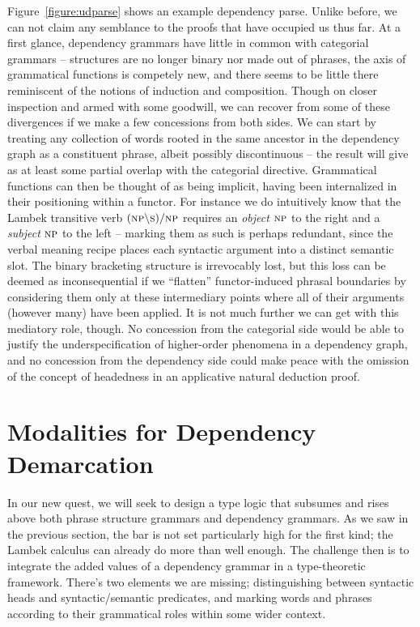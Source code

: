 Figure~\ref{figure:udparse} shows an example dependency parse.
Unlike before, we can not claim any semblance to the proofs that have occupied us thus far.
At a first glance, dependency grammars have little in common with categorial grammars -- structures are no longer binary nor made out of phrases, the axis of grammatical functions is competely new, and there seems to be little there reminiscent of the notions of induction and composition.
Though on closer inspection and armed with some goodwill, we can recover from some of these divergences if we make a few concessions from both sides.
We can start by treating any collection of words rooted in the same ancestor in the dependency graph as a constituent phrase, albeit possibly discontinuous -- the result will give as at least some partial overlap with the categorial directive.
Grammatical functions can then be thought of as being implicit, having been internalized in their positioning within a functor.
For instance we do intuitively know that the Lambek transitive verb $(\np[s]\divleft\s[s])\divright\np[s]$ requires an \textit{object} $\np[s]$ to the right and a \textit{subject} $\np[s]$ to the left -- marking them as such is perhaps redundant, since the verbal meaning recipe places each syntactic argument into a distinct semantic slot.
The binary bracketing structure is irrevocably lost, but this loss can be deemed as inconsequential if we ``flatten'' functor-induced phrasal boundaries by considering them only at these intermediary points where all of their arguments (however many) have been applied.
It is not much further we can get with this mediatory role, though.
No concession from the categorial side would be able to justify the underspecification of higher-order phenomena in a dependency graph,
and no concession from the dependency side could make peace with the omission of the concept of headedness in an applicative natural deduction proof.


\section{Modalities for Dependency Demarcation}
In our new quest, we will seek to design a type logic that subsumes and rises above both phrase structure grammars and dependency grammars.
As we saw in the previous section, the bar is not set particularly high for the first kind; the Lambek calculus can already do more than well enough.
The challenge then is to integrate the added values of a dependency grammar in a type-theoretic framework.
There's two elements we are missing; distinguishing between syntactic heads and syntactic/semantic predicates, and marking words and phrases according to their grammatical roles within some wider context.

